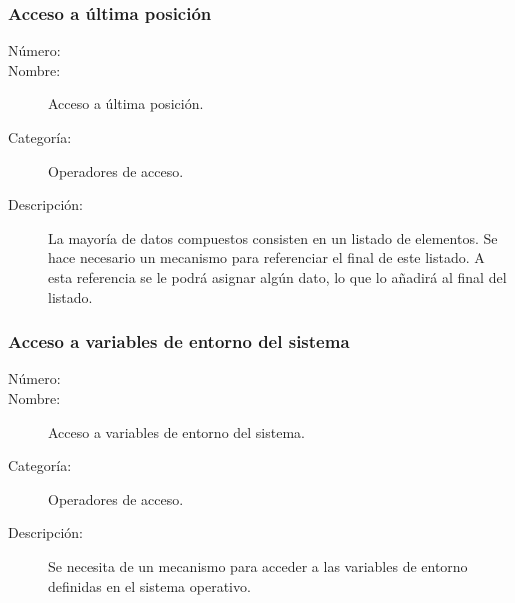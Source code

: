\subsubsection{Acceso a última posición}
\begin{framed}
	\begin{description}
		\item [Número:] \cn
		\item [Nombre:] Acceso a última posición.
		\item [Categoría:] Operadores de acceso.
		\item [Descripción:] La mayoría de datos compuestos consisten en un listado de elementos. Se hace necesario un mecanismo
		para referenciar el final de este listado. A esta referencia se le podrá asignar algún dato, lo que lo añadirá al final del listado.
	\end {description}
\end{framed}

\subsubsection{Acceso a variables de entorno del sistema}
\begin{framed}
	\begin{description}
		\item [Número:] \cn
		\item [Nombre:] Acceso a variables de entorno del sistema.
		\item [Categoría:] Operadores de acceso.
		\item [Descripción:] Se necesita de un mecanismo para acceder a las variables de entorno definidas en el sistema operativo. 
	\end{description}
\end{framed}

